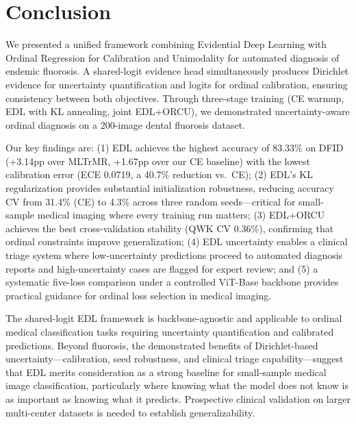 \section{Conclusion}

We presented a unified framework combining Evidential Deep Learning with Ordinal Regression for Calibration and Unimodality for automated diagnosis of endemic fluorosis. A shared-logit evidence head simultaneously produces Dirichlet evidence for uncertainty quantification and logits for ordinal calibration, ensuring consistency between both objectives. Through three-stage training (CE warmup, EDL with KL annealing, joint EDL+ORCU), we demonstrated uncertainty-aware ordinal diagnosis on a 200-image dental fluorosis dataset.

Our key findings are: (1) EDL achieves the highest accuracy of 83.33\% on DFID (+3.14pp over MLTrMR, +1.67pp over our CE baseline) with the lowest calibration error (ECE 0.0719, a 40.7\% reduction vs.\ CE); (2) EDL's KL regularization provides substantial initialization robustness, reducing accuracy CV from 31.4\% (CE) to 4.3\% across three random seeds---critical for small-sample medical imaging where every training run matters; (3) EDL+ORCU achieves the best cross-validation stability (QWK CV 0.36\%), confirming that ordinal constraints improve generalization; (4) EDL uncertainty enables a clinical triage system where low-uncertainty predictions proceed to automated diagnosis reports and high-uncertainty cases are flagged for expert review; and (5) a systematic five-loss comparison under a controlled ViT-Base backbone provides practical guidance for ordinal loss selection in medical imaging.

The shared-logit EDL framework is backbone-agnostic and applicable to ordinal medical classification tasks requiring uncertainty quantification and calibrated predictions. Beyond fluorosis, the demonstrated benefits of Dirichlet-based uncertainty---calibration, seed robustness, and clinical triage capability---suggest that EDL merits consideration as a strong baseline for small-sample medical image classification, particularly where knowing what the model does not know is as important as knowing what it predicts. Prospective clinical validation on larger multi-center datasets is needed to establish generalizability.
